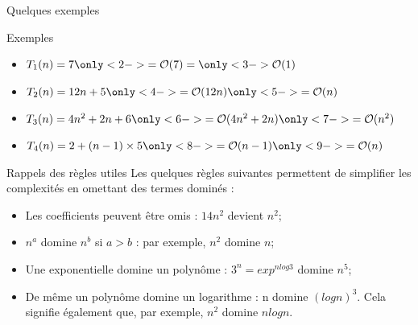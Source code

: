 \documentclass[10pt,xcolor=dvipsnames]{beamer}
\begin{document}
\begin{frame}{Quelques exemples}
    \begin{exampleblock}{Exemples}
\begin{itemize}
    \item $T_1(n) = 7 \only<2->{= \mathcal{O}(7)} = \only<3->{\mathcal{O}(1)}$
    \item $T_2(n) = 12n + 5 \only<4->{= \mathcal{O}(12n)} \only<5->{= \mathcal{O}(n)}$
    \item $T_3(n) = 4n^2 + 2n + 6 \only<6->{= \mathcal{O}(4n^2 + 2n)} \only<7->{= \mathcal{O}(n^2)}$
    \item $T_4(n) = 2 + (n-1) \times 5 \only<8->{= \mathcal{O}(n-1)} \only<9->{= \mathcal{O}(n)}$
\end{itemize}
\end{exampleblock}


\end{frame}

\begin{frame}{Rappels des règles utiles}
Les quelques règles suivantes permettent de simplifier les complexités en omettant des termes dominés :
\begin{itemize}
    \item Les \alert{coefficients peuvent être omis} : $14n^2$ devient $n^2$;
    \item $n^a$ domine $n^b$ si $a > b$ : par exemple, $n^2$ domine $n$;
    \item Une exponentielle domine un polynôme : $3^n=exp^{nlog3}$ domine $n^5$;
    \item De même un polynôme domine un logarithme : n domine $(log n)^3$. Cela signifie également que, par exemple, $n^2$ domine $n log n$.
\end{itemize}
\end{frame}
\end{document}
